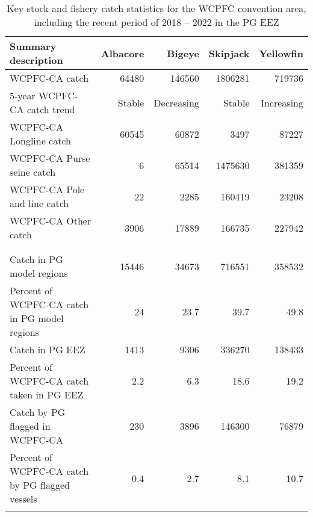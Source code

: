 \begin{longtable}{lrrrr}
\caption{Key stock and fishery catch statistics for the WCPFC convention area, including the recent period of 2018 -- 2022 in the PG EEZ} \\ 
  \hline
Summary description & Albacore & Bigeye & Skipjack & Yellowfin \\ 
  \hline
WCPFC-CA catch & 64480 & 146560 & 1806281 & 719736 \\ 
  5-year WCPFC-CA catch trend & Stable & Decreasing & Stable & Increasing \\ 
  WCPFC-CA Longline catch & 60545 & 60872 & 3497 & 87227 \\ 
  WCPFC-CA Purse seine catch & 6 & 65514 & 1475630 & 381359 \\ 
  WCPFC-CA Pole and line catch & 22 & 2285 & 160419 & 23208 \\ 
  WCPFC-CA Other catch & 3906 & 17889 & 166735 & 227942 \\ 
   &  &  &  &  \\ 
   \hline
 &  &  &  &  \\ 
  Catch in PG model regions & 15446 & 34673 & 716551 & 358532 \\ 
  Percent of WCPFC-CA catch in PG model regions & 24 & 23.7 & 39.7 & 49.8 \\ 
  Catch in PG EEZ & 1413 & 9306 & 336270 & 138433 \\ 
  Percent of WCPFC-CA catch taken in PG EEZ & 2.2 & 6.3 & 18.6 & 19.2 \\ 
  Catch by PG flagged in WCPFC-CA & 230 & 3896 & 146300 & 76879 \\ 
  Percent of WCPFC-CA catch by PG flagged vessels & 0.4 & 2.7 & 8.1 & 10.7 \\ 
  \hline
\label{cat_sum_tab}
\end{longtable}
